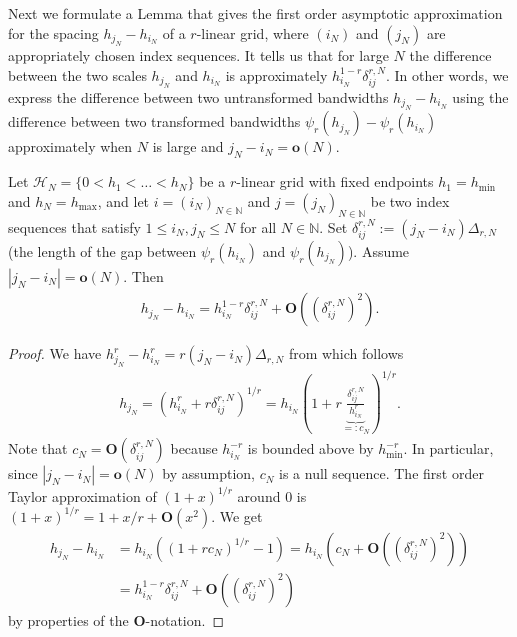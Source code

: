 Next we formulate a Lemma that gives the first order asymptotic approximation for the spacing $h_{j_N}-h_{i_N}$ of a $r$-linear grid, where $(i_N)$ and $(j_N)$ are appropriately chosen index sequences. It tells us that for large $N$ the difference between the two scales $h_{j_N}$ and $h_{i_N}$ is approximately $h_{i_N}^{1-r}\delta_{ij}^{r,N}$. In other words, we express the difference between two untransformed bandwidths $h_{j_N}-h_{i_N}$ using the difference between two transformed bandwidths $\psi_r(h_{j_N})-\psi_r(h_{i_N})$ approximately when $N$ is large and $j_N-i_N=\mathbf{o}(N)$.

\begin{Lem}\label{lem:asymptotic_approx_r_linear_spacing}
    Let $\mathcal{H}_N=\{0<h_1<\dots<h_N\}$ be a $r$-linear grid with fixed endpoints $h_1=h_{\min}$ and $h_N=h_{\max}$, and let $i=(i_N)_{N\in\mathbb{N}}$ and $j=(j_N)_{N\in\mathbb{N}}$ be two index sequences that satisfy $1\le i_N,j_N\le N$ for all $N\in\mathbb{N}$. Set $\delta^{r,N}_{ij}:=(j_N-i_N)\Delta_{r,N}$ (the length of the gap between $\psi_r(h_{i_N})$ and $\psi_r(h_{j_N})$). Assume $|j_N-i_N|=\mathbf{o}(N)$. Then
    \begin{align*}
        h_{j_N}-h_{i_N}=h_{i_N}^{1-r}\delta_{ij}^{r,N}+\mathbf{O}((\delta_{ij}^{r,N})^2).
    \end{align*}
\end{Lem}

\begin{proof}
    We have $h_{j_N}^r-h_{i_N}^r=r(j_N-i_N)\Delta_{r,N}$ from which follows
    \begin{align*}
        h_{j_N}=\left(h_{i_N}^r+r\delta_{ij}^{r,N}\right)^{1/r}=h_{i_N}\left(1+r\underbrace{\frac{\delta_{ij}^{r,N}}{h_{i_N}^r}}_{=:c_N}\right)^{1/r}.
    \end{align*}
    Note that $c_N=\mathbf{O}(\delta_{ij}^{r,N})$ because $h_{i_N}^{-r}$ is bounded above by $h_{\min}^{-r}$. In particular, since $|j_N-i_N|=\mathbf{o}(N)$ by assumption, $c_N$ is a null sequence. The first order Taylor approximation of $(1+x)^{1/r}$ around $0$ is $(1+x)^{1/r}=1+x/r+\mathbf{O}(x^2)$. We get
    \begin{align*}
        h_{j_N}-h_{i_N}&=h_{i_N}\left(\left(1+rc_N\right)^{1/r}-1\right)=h_{i_N}\left(c_N+\mathbf{O}((\delta_{ij}^{r,N})^2)\right)\\&
        =h_{i_N}^{1-r}\delta_{ij}^{r,N}+\mathbf{O}((\delta_{ij}^{r,N})^2)
    \end{align*}
    by properties of the $\mathbf{O}$-notation.
\end{proof}


